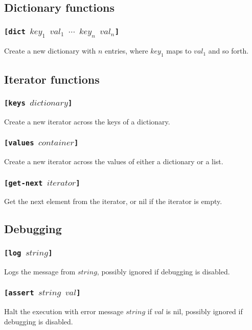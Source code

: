 \subsection{Dictionary functions}
\subsubsection{\tt{[dict }$key_1$  $val_1$ $\cdots$ $key_n$ $val_n$\tt{]}}
Create a new dictionary with $n$ entries, where $key_1$ maps to $val_1$ and so forth.

\subsection{Iterator functions}
\subsubsection{\tt{[keys }$dictionary$\tt{]}}
Create a new iterator across the keys of a dictionary.
\subsubsection{\tt{[values }$container$\tt{]}}
Create a new iterator across the values of either a dictionary or a list.
\subsubsection{\tt{[get-next }$iterator$\tt{]}}
Get the next element from the iterator, or nil if the iterator is empty.

\subsection{Debugging}
\subsubsection{\tt{[log }$string$\tt{]}}
Logs the message from $string$, possibly ignored if debugging is disabled.
\subsubsection{\tt{[assert }$string$ $val$\tt{]}}
Halt the execution with error message $string$ if $val$ is nil, possibly ignored if debugging is disabled.

